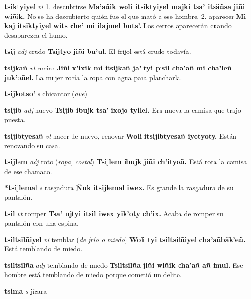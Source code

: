 \documentclass[10pt]{scrbook}
\newcommand{\entry}[1]{\textbf{#1}}
\newcommand{\onedefinition}[1]{#1.}
\newcommand{\partofspeech}[1]{\textit{#1}}
\newcommand{\spanishtranslation}[1]{#1}
\newcommand{\clarification}[1]{(\textit{#1})}
\newcommand{\cholexample}[1]{\textbf{#1}}
\newcommand{\exampletranslation}[1]{#1}
\begin{document}
\begin{multicols}{2}
\entry{tsiktyiyel}
\partofspeech{vi}
\onedefinition{1}
\spanishtranslation{descubrirse}
\cholexample{Ma'añik woli itsiktyiyel majki tsa' itsäñsa jiñi wiñik.}
\exampletranslation{No se ha descubierto quién fue el que mató a ese hombre.}
\onedefinition{2}
\spanishtranslation{aparecer}
\cholexample{Mi kaj itsiktyiyel wits che' mi ilajmel buts'.}
\exampletranslation{Los cerros aparecerán cuando desaparezca el humo.}

\entry{tsij}
\partofspeech{adj}
\spanishtranslation{crudo}
\cholexample{Tsijtyo jiñi bu'ul.}
\exampletranslation{El frijol está crudo todavía.}

\entry{tsijkañ}
\partofspeech{vt}
\spanishtranslation{rociar}
\cholexample{Jiñi x'ixik mi itsijkañ ja' tyi pisil cha'añ mi cha'leñ juk'oñel.}
\exampletranslation{La mujer rocía la ropa con agua para plancharla.}

\entry{tsijkotso'}
\partofspeech{s}
\spanishtranslation{chicantor}
\clarification{ave}

\entry{tsijib}
\partofspeech{adj}
\spanishtranslation{nuevo}
\cholexample{Tsijib ibujk tsa' ixojo tyilel.}
\exampletranslation{Era nueva la camisa que trajo puesta.}

\entry{tsijibtyesañ}
\partofspeech{vt}
\spanishtranslation{hacer de nuevo, renovar}
\cholexample{Woli itsijibtyesañ iyotyoty.}
\exampletranslation{Están renovando su casa.}

\entry{tsijlem}
\partofspeech{adj}
\spanishtranslation{roto}
\clarification{ropa, costal}
\cholexample{Tsijlem ibujk jiñi ch'ityoñ.}
\exampletranslation{Está rota la camisa de ese chamaco.}

\entry{*tsijlemal}
\partofspeech{s}
\spanishtranslation{rasgadura}
\cholexample{Ñuk itsijlemal iwex.}
\exampletranslation{Es grande la rasgadura de su pantalón.}

\entry{tsil}
\partofspeech{vt}
\spanishtranslation{romper}
\cholexample{Tsa' ujtyi itsil iwex yik'oty ch'ix.}
\exampletranslation{Acaba de romper su pantalón con una espina.}

\entry{tsiltsilñiyel}
\partofspeech{vi}
\spanishtranslation{temblar}
\clarification{de frío o miedo}
\cholexample{Woli tyi tsiltsilñiyel cha'añbäk'eñ.}
\exampletranslation{Está temblando de miedo.}

\entry{tsiltsilña}
\partofspeech{adj}
\spanishtranslation{temblando de miedo}
\cholexample{Tsiltsilña jiñi wiñik cha'añ añ imul.}
\exampletranslation{Ese hombre está temblando de miedo porque cometió un delito.}

\entry{tsima}
\partofspeech{s}
\spanishtranslation{jícara}


\end{multicols}
\end{document}
